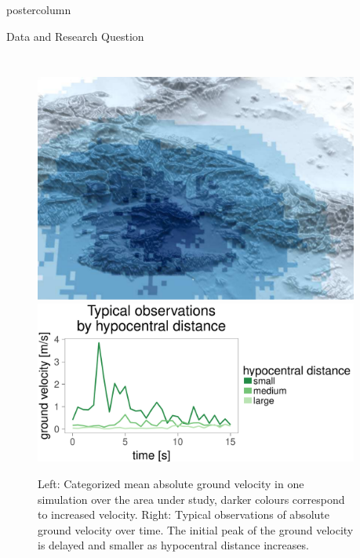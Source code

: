 \documentclass[final,hyperref={pdfpagelabels=false}]{beamer}
\begin{document}
\begin{frame}
\begin{columns}
\begin{column}{1\textwidth}
\begin{beamercolorbox}[center,wd=\textwidth]{postercolumn}
\begin{minipage}[T]{.95\textwidth}
\begin{block}{\footnotesize Data and Research Question}
\begin{columns}[t]
\begin{column}{.6\textwidth}
\begin{tabularx}{\textwidth}{ZZ}
  \end{tabularx}
  \vspace{2ex}
  \begin{figure}[!ht]\centering
  \includegraphics[width=0.2\linewidth]{figures/bauer_73_gm_3D_ausschnitt.pdf}
  \hspace{5ex}
  \includegraphics[width=0.27\linewidth]{figures/motivation2.pdf}
  \caption{\footnotesize Left: Categorized mean absolute ground velocity in one simulation over the area under study, darker colours correspond to increased velocity. Right: Typical observations of absolute ground velocity over time. The initial peak of the ground velocity is delayed and smaller as hypocentral distance increases.}
  \end{figure}
  \end{column}
  
  \hspace{-1.5ex}
  \textcolor{LMUlightgray}{\vrule{}}
  \hspace{1.5ex}
  

\end{columns}
\end{block}
\end{minipage}
\end{beamercolorbox}
\end{column}
\end{columns}
\end{frame}
\end{document}
